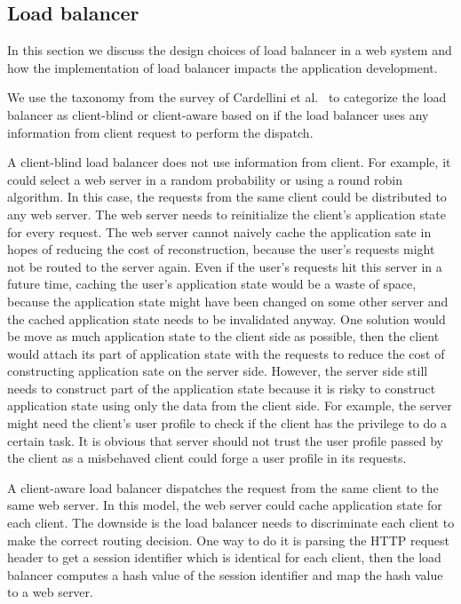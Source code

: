 \subsection{Load balancer}

In this section we discuss the design choices of load balancer in a web system
and how the implementation of load balancer impacts the application development.

We use the taxonomy from the survey of Cardellini et al.~\cite{cardellini2002state}
to categorize the load balancer as client-blind or client-aware based on if
the load balancer uses any information from client request to perform the dispatch.

A client-blind load balancer does not use information from client.
For example, it could select a web server in a random probability or using a round robin algorithm.
In this case, the requests from the same client could be distributed to any web server.
The web server needs to reinitialize the client's application state for every request.
The web server cannot naively cache the application sate in hopes of reducing the
cost of reconstruction,
because the user's requests might not be routed to the server again.
Even if the user's requests hit this server in a future time,
caching the user's application state would be a waste of space,
because the application state might have been changed on some other server
and the cached application state needs to be invalidated anyway.
One solution would be move as much application state to the client side as possible,
then the client would attach its part of application state
with the requests to reduce the cost of constructing application sate on the server side.
However, the server side still needs to construct part of the application state
because it is risky to construct application state using only the data from
the client side.
For example,
the server might need the client's user profile to check if the client has
the privilege to do a certain task.
It is obvious that server should not trust the user profile passed by the client
as a misbehaved client could forge a user profile in its requests.

A client-aware load balancer dispatches the request from the same
client to the same web server.
In this model, the web server could cache application state for each client.
The downside is the load balancer needs to discriminate each client
to make the correct routing decision.
One way to do it is parsing the HTTP request header to get
a session identifier which is identical for each client,
then the load balancer computes a hash value of
the session identifier and map the hash value to a web server.

